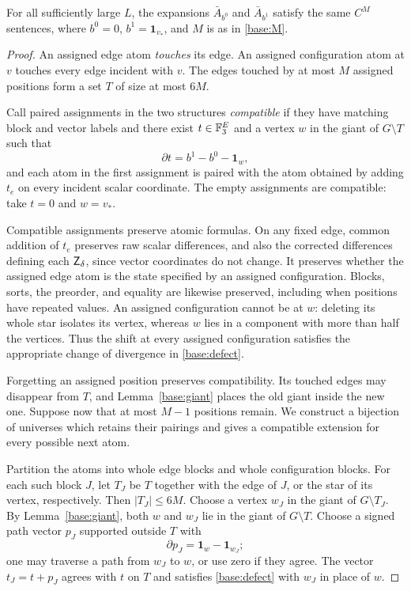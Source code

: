 \begin{proposition}
\label{base:equivalence}
For all sufficiently large $L$, the expansions $\bar A_{b^0}$ and
$\bar A_{b^1}$ satisfy the same $C^M$ sentences, where
$b^0=0$, $b^1=\mathbf1_{v_*}$, and $M$ is as in
\eqref{base:M}.
\end{proposition}
\begin{proof}
An assigned edge atom \emph{touches} its edge.  An assigned configuration
atom at $v$ touches every edge incident with $v$.  The edges touched by
at most $M$ assigned positions form a set $T$ of size at most $6M$.

Call paired assignments in the two structures \emph{compatible} if they
have matching block and vector labels and there exist $t\in\mathbb F_3^E$ and
a vertex $w$ in the giant of $G\setminus T$ such that
\begin{equation}
\label{base:defect}
 \partial t=b^1-b^0-\mathbf1_w,
\end{equation}
and each atom in the first assignment is paired with the atom obtained
by adding $t_e$ on every incident scalar coordinate.  The empty
assignments are compatible: take $t=0$ and $w=v_*$.

Compatible assignments preserve atomic formulas.  On any fixed edge,
common addition of $t_e$ preserves raw scalar differences, and also the
corrected differences defining each $\mathsf Z_\delta$, since vector
coordinates do not change.  It preserves whether the assigned edge
atom is the state specified by an assigned configuration.  Blocks,
sorts, the preorder, and equality are likewise preserved, including
when positions have repeated values.  An assigned configuration cannot
be at $w$: deleting its whole star isolates its vertex, whereas $w$
lies in a component with more than half the vertices.  Thus the shift
at every assigned configuration satisfies the appropriate change of
divergence in \eqref{base:defect}.

Forgetting an assigned position preserves compatibility.  Its touched
edges may disappear from $T$, and Lemma~\ref{base:giant} places the old
giant inside the new one.  Suppose now that at most $M-1$ positions
remain.  We construct a bijection of universes which retains their
pairings and gives a compatible extension for every possible next atom.

Partition the atoms into whole edge blocks and whole configuration
blocks.  For each such block $J$, let $T_J$ be $T$ together with the
edge of $J$, or the star of its vertex, respectively.  Then
$|T_J|\le6M$.  Choose a vertex $w_J$ in the giant of $G\setminus T_J$.
By Lemma~\ref{base:giant}, both $w$ and $w_J$ lie in the giant of
$G\setminus T$.  Choose a signed path vector $p_J$ supported outside
$T$ with
\[
 \partial p_J=\mathbf1_w-\mathbf1_{w_J};
\]
one may traverse a path from $w_J$ to $w$, or use zero if they agree.
The vector $t_J=t+p_J$ agrees with $t$ on $T$ and satisfies
\eqref{base:defect} with $w_J$ in place of $w$.


\end{proof}
